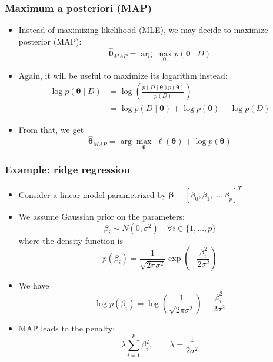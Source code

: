 \documentclass{beamer}
\begin{document}
		
	\begin{frame}
		\frametitle{Maximum a posteriori (MAP)}
		\begin{itemize}
			\item Instead of maximizing likelihood (MLE), we may decide to maximize posterior (MAP):
			$$
			\hat{\bm{\theta}}_{MAP} = \arg\max_{\bm{\theta}} p(\bm{\theta} \mid D)
			$$	
			\pause
			\item Again, it will be useful to maximize its logarithm instead:
			\begin{align*}			
				\log p(\bm{\theta} \mid D)
				&= \log \left(\frac{p(D \mid \bm{\theta}) p(\bm{\theta})}{p(D)}\right) \\
				&= \log	p(D \mid \bm{\theta}) + \log 	p(\bm{\theta})	- \log 	p(D)					
			\end{align*}
			\pause
			\item From that, we get
			$$
			\hat{\bm{\theta}}_{MAP} = \arg\max_{\bm{\theta}}\; \ell(\bm{\theta}) + \log p(\bm{\theta})
			$$
			
		
		\end{itemize}
		
	\end{frame}
		\begin{frame}
			\frametitle{Example: ridge regression}
			\begin{itemize}
				\item Consider a linear model parametrized by $\bm{\beta} = [\beta_0, \beta_1,...,\beta_p]^T$
				\pause
				\item We assume Gaussian prior on the parameters:
				$$
				\beta_i \sim N(0, \sigma^2) \quad \forall i \in \{1,...,p\}
				$$
				where the density function is 
				$$
				p(\beta_i) = \frac{1}{\sqrt{2 \pi \sigma^2}} \exp \left( - \frac{\beta_i^2 }{2\sigma^2} \right)
				$$
				\pause
				\item We have
				$$
				\log p(\beta_i) = \log \left( \frac{1}{\sqrt{2 \pi \sigma^2}} \right) - \frac{\beta_i^2 }{2\sigma^2}
				$$
				\pause
				\item MAP leads to the penalty:
				$$
				\lambda \sum_{i=1}^{p} \beta_i^2, \qquad \lambda = \frac{1}{2\sigma^2}
				$$			
				
			\end{itemize}
\end{frame}
	
	
\end{document}
